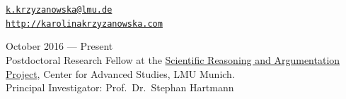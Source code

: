 \documentclass[11pt,article,oneside]{memoir}
\makeatletter
\def\myemail{k.krzyzanowska@lmu.de}
\def\myweb{http://karolinakrzyzanowska.com}
\def\myphone{}
\makeatother
\begin{document}
  
\hfill     
\hfill
\begin{minipage}[t]{1.8in}
  \flushright \footnotesize  \addressblock %
  {\small  \texttt{\href{mailto:\myemail}{\myemail}} \, \faEnvelope} \\
  {\small  \texttt{\href{\myweb}{\myweb}} \, \faGlobe}
\end{minipage}


\medskip

\reversemarginpar

\bigskip       


{}

\ind October 2016 --- Present\\
Postdoctoral Research Fellow at the \href{http://www.en.cas.uni-muenchen.de/rir/senior_rir/current_senior_rir/hartmann_stephan/index.html}{Scientific Reasoning and Argumentation Project}, Center for Advanced Studies, LMU Munich. \\
Principal Investigator: Prof.\ Dr.\ Stephan Hartmann
\end{document}
